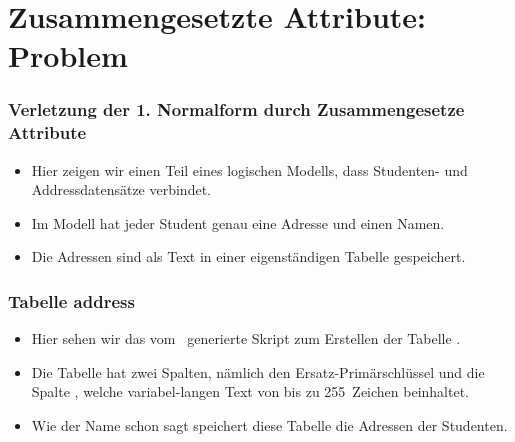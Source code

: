 \documentclass[aspectratio=169,mathserif,notheorems]{beamer}%
\begin{document}
\section{Zusammengesetzte Attribute: Problem}%
%
\begin{frame}[t]%
\frametitle{Verletzung der 1. Normalform durch Zusammengesetze Attribute}%
\begin{itemize}%
%
\item Hier zeigen wir einen Teil eines logischen Modells, dass Studenten- und Addressdatensätze verbindet.%
%
\item<2-> Im Modell hat jeder Student genau eine Adresse und einen Namen.%
%
\item<3-> Die Adressen sind als Text in einer eigenständigen Tabelle gespeichert.%
\end{itemize}%
%
\end{frame}%
%
%
\begin{frame}[t]%
\frametitle{Tabelle address}%
\parbox{0.435\linewidth}{\small%
\begin{itemize}%
%
\item Hier sehen wir das vom \pgmodeler\ generierte Skript zum Erstellen der Tabelle .%
%
\item<2-> Die Tabelle hat zwei Spalten, nämlich den Ersatz-Primärschlüssel  und die Spalte , welche variabel-langen Text von bis zu 255~Zeichen beinhaltet.%
%
\item<3-> Wie der Name schon sagt speichert diese Tabelle die Adressen der Studenten.%
%
\end{itemize}%
}%
%
%
%
\end{frame}%
%
%
\end{document}
